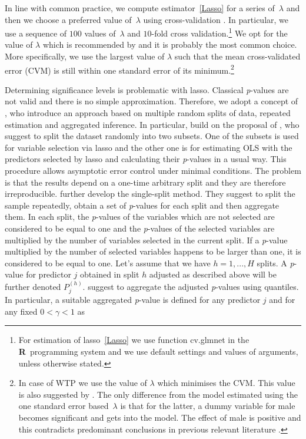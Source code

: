 \documentclass[a4paper,12pt]{article}
\begin{document}
In line with common practice, we compute estimator~\eqref{Lasso} for a series of~$\lambda$ and then we choose a preferred value of~$\lambda$ using cross-validation \citep{statisHighDimData}. In particular, we use a sequence of $100$ values of~$\lambda$ and $10$\nobreakdash-fold cross validation.\footnote{For estimation of lasso~\eqref{Lasso} we use function cv.glmnet in the \textbf{\textsf{R}}~programming system \citep{RRRR} and we use default settings and values of arguments, unless otherwise stated.} We opt for the value of $\lambda$ which is recommended by \citet{Friedman2010} and it is probably the most common choice. More specifically, we use the largest value of $\lambda$  such that the mean cross-validated error (CVM) is still within one standard error of its minimum.\footnote{In case of WTP we use the value of $\lambda$ which minimises the CVM. This value is also  suggested by \citet{Friedman2010}. The only difference from the model estimated using the one standard error based~$\lambda$ is that for the latter, a dummy variable for male becomes significant and gets into the model. The effect of male is positive and this contradicts predominant conclusions in previous relevant literature \citetext{e.g. \citealt*{Hamilton2011, McCright2010, HamiltonKeim2009, Flynn1994}}.}

Determining significance levels is problematic with lasso. Classical \textit{p}-values are not valid and there is no simple approximation. Therefore, we adopt a concept of \citet{pValsLasso}, who introduce an approach based on multiple random splits of data, repeated estimation and aggregated inference. In particular, \citet{pValsLasso} build on the proposal of \citet{Wasserman2009}, who suggest to split the dataset randomly into two subsets. One of the subsets is used for variable selection via lasso and the other one is for estimating OLS with the predictors selected by lasso and calculating their \textit{p}-values in a usual way. This procedure allows asymptotic error control under minimal conditions. The problem is that the results depend on a one-time arbitrary split and they are therefore irreproducible. \citet{pValsLasso} further develop the single-split method. They suggest to split the sample repeatedly, obtain a set of \textit{p}-values for each split and then aggregate them. In each split, the \textit{p}-values of the variables which are not selected are considered to be equal to one and the \textit{p}-values of the selected variables are multiplied by the number of variables selected in the current split. If a \textit{p}-value multiplied by the number of selected variables happens to be larger than one, it is considered to be equal to one. Let's assume that we have $h=1,...,H$ splits. A \textit{p}-value for predictor $j$ obtained in split $h$ adjusted as described above will be further denoted $P^{(h)}_j$. \citet{pValsLasso} suggest to aggregate the adjusted \textit{p}-values using quantiles. In particular, a suitable aggregated \textit{p}-value is defined for any predictor $j$ and for any fixed $0<\gamma<1$ as 
\end{document}
